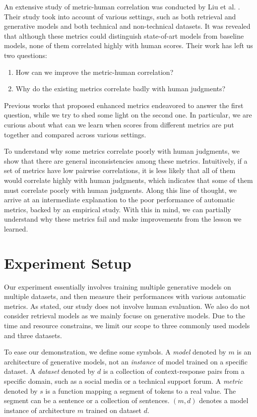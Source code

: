 \documentclass[conference]{IEEEtran}
\begin{document}
An extensive study of metric-human correlation was conducted by Liu et al. \cite{HowNot}. Their study took into account of various settings, such as both retrieval and generative models and both technical and non-technical datasets. It was revealed that although these metrics could distinguish state-of-art models from baseline models, none of them correlated highly with human scores. Their work has left us two questions:
\begin{enumerate}
    \item How can we improve the metric-human correlation?
    \item Why do the existing metrics correlate badly with human judgments?
\end{enumerate}
Previous works that proposed enhanced metrics endeavored to answer the first question, while we try to shed some light on the second one. In particular, we are curious about what can we learn when scores from different metrics are put together and compared across various settings.

To understand why some metrics correlate poorly with human judgments, we show that there are general inconsistencies among these metrics. Intuitively, if a set of metrics have low pairwise correlations, it is less likely that all of them would correlate highly with human judgments, which indicates that some of them must correlate poorly with human judgments. Along this line of thought, we arrive at an intermediate explanation to the poor performance of automatic metrics, backed by an empirical study. With this in mind, we can partially understand why these metrics fail and make improvements from the lesson we learned.

\section{Experiment Setup}
Our experiment essentially involves training multiple generative models on multiple datasets, and then measure their performances with various automatic metrics. As stated, our study does not involve human evaluation. We also do not consider retrieval models as we mainly focuse on generative models. Due to the time and resource constrains, we limit our scope to three commonly used models and three datasets.

To ease our demonstration, we define some symbols. A \emph{model} denoted by $m$ is an architecture of generative models, not an \emph{instance} of model trained on a specific dataset. A \emph{dataset} denoted by $d$ is a collection of context-response pairs from a specific domain, such as a social media or a technical support forum. A \emph{metric} denoted by $s$ is a function mapping a segment of tokens to a real value. The segment can be a sentence or a collection of sentences. $(m, d)$ denotes a model instance of architecture $m$ trained on dataset $d$.
\end{document}
